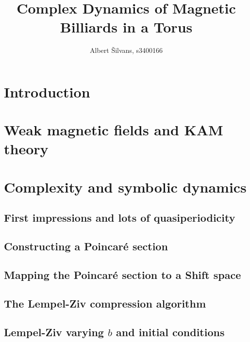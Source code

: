 \documentclass[notitlepage, a4paper]{article}
\title{Complex Dynamics of Magnetic Billiards in a Torus}
\author{Albert \v{S}ilvans, s3400166}
\theoremstyle{definition}
\begin{document}
\maketitle
\newpage
\tableofcontents
\listoffigures
\newpage

\section{Introduction}



\newpage

\section{Weak magnetic fields and KAM theory}





\newpage

\section{Complexity and symbolic dynamics}


\subsection{First impressions and lots of quasiperiodicity}


\subsection{Constructing a Poincar\'e section}


\subsection{Mapping the Poincar\'e section to a Shift space}


\subsection{The Lempel-Ziv compression algorithm}


\subsection{Lempel-Ziv varying $b$ and initial conditions}

\end{document}
